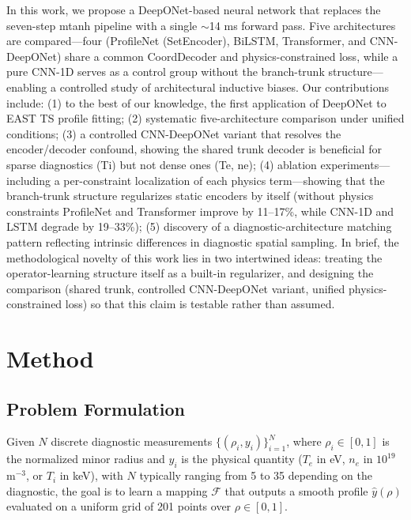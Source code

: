 \documentclass[a4paper,12pt]{article}
\begin{document}
In this work, we propose a DeepONet-based neural network that replaces the seven-step mtanh pipeline with a single $\sim$14 ms forward pass. Five architectures are compared---four (ProfileNet (SetEncoder), BiLSTM, Transformer, and CNN-DeepONet) share a common CoordDecoder and physics-constrained loss, while a pure CNN-1D serves as a control group without the branch-trunk structure---enabling a controlled study of architectural inductive biases. Our contributions include: (1) to the best of our knowledge, the first application of DeepONet to EAST TS profile fitting; (2) systematic five-architecture comparison under unified conditions; (3) a controlled CNN-DeepONet variant that resolves the encoder/decoder confound, showing the shared trunk decoder is beneficial for sparse diagnostics (Ti) but not dense ones (Te, ne); (4) ablation experiments---including a per-constraint localization of each physics term---showing that the branch-trunk structure regularizes static encoders by itself (without physics constraints ProfileNet and Transformer improve by 11--17\%, while CNN-1D and LSTM degrade by 19--33\%); (5) discovery of a diagnostic-architecture matching pattern reflecting intrinsic differences in diagnostic spatial sampling. In brief, the methodological novelty of this work lies in two intertwined ideas: treating the operator-learning structure itself as a built-in regularizer, and designing the comparison (shared trunk, controlled CNN-DeepONet variant, unified physics-constrained loss) so that this claim is testable rather than assumed.

\section{Method}

\subsection{Problem Formulation}

Given $N$ discrete diagnostic measurements $\{(\rho_i, y_i)\}_{i=1}^N$, where $\rho_i \in [0, 1]$ is the normalized minor radius and $y_i$ is the physical quantity ($T_e$ in eV, $n_e$ in $10^{19}$ m$^{-3}$, or $T_i$ in keV), with $N$ typically ranging from 5 to 35 depending on the diagnostic, the goal is to learn a mapping $\mathcal{F}$ that outputs a smooth profile $\hat{y}(\rho)$ evaluated on a uniform grid of 201 points over $\rho \in [0, 1]$.
\end{document}
